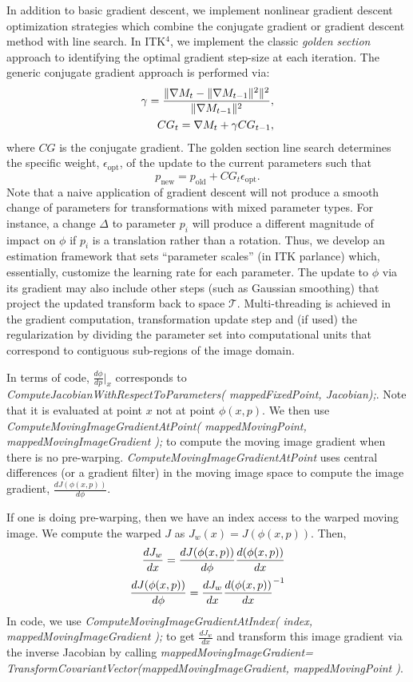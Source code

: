 \documentclass{frontiersSCNS}
\begin{document}
In addition to basic gradient descent, we implement nonlinear gradient
descent optimization strategies which combine the conjugate gradient
or gradient descent method with line search.  In ITK$^4$, we implement the classic \textit{golden section} approach to identifying the optimal gradient
step-size at each iteration.  The generic conjugate gradient approach
is performed via: 
\begin{align}
\gamma=\frac{\|\nabla M_{t}-\|\nabla M_{t-1}\|^2\|^2}{\|\nabla
  M_{t-1}\|^2}, \\ \notag
CG_t = \nabla M_t + \gamma CG_{t-1},
\end{align}
where $CG$ is the conjugate gradient.  The golden section line search
determines the specific weight, $\epsilon_\text{opt}$, of the update to the current parameters
such that 
$$ 
p_{\text{new}}=p_{\text{old}}+CG_t \epsilon_\text{opt}.
$$
Note that a naive application of gradient descent will not produce a smooth
change of parameters for transformations with mixed parameter types.
For instance, a change $\Delta$ to parameter $p_i$ will produce a
different magnitude of impact on $\phi$ if $p_i$ is a translation rather than a
rotation.  Thus, we develop an estimation framework that sets
``parameter scales'' (in ITK parlance) which, essentially, customize
the learning rate for each parameter.  The update to
$\phi$ via its gradient may also include other steps (such as Gaussian
smoothing) that project the updated transform back to space
$\mathcal{T}$.  Multi-threading is achieved in the gradient computation, transformation update
step and (if used) the regularization by dividing the parameter set
into computational units that correspond to contiguous sub-regions of the image domain.

In terms of code, $\frac{d\phi}{dp}|_x$ corresponds to \textit{ComputeJacobianWithRespectToParameters( mappedFixedPoint, Jacobian);}.  Note that it is evaluated at point $x$ not at point $\phi(x,p)$.  We
then use \textit{ComputeMovingImageGradientAtPoint( mappedMovingPoint,
mappedMovingImageGradient );} to compute the moving image gradient
when there is no pre-warping.  \textit{ComputeMovingImageGradientAtPoint} uses central
differences (or a gradient filter) in the moving image space to
compute the image gradient, $\frac{dJ(\phi(x,p))}{d\phi}$.

 If one is doing pre-warping, then we have an index access to the
 warped moving image.  We compute the warped $J$ as
 $J_w(x)=J(\phi(x,p))$.  Then,
\begin{eqnarray}
\frac{dJ_w}{dx}=\frac{dJ(\phi(x,p))}{d\phi}\frac{d(\phi(x,p))}{dx} \\ \notag
\frac{dJ(\phi(x,p))}{d\phi}=\frac{dJ_w}{dx}{\frac{d(\phi(x,p))}{dx}}^{-1} 
\end{eqnarray}
In code, we use \textit{ComputeMovingImageGradientAtIndex( index,
mappedMovingImageGradient );} to get $\frac{dJ_w}{dx}$ and transform
this image gradient via the inverse Jacobian by calling 
\textit{mappedMovingImageGradient=
TransformCovariantVector(mappedMovingImageGradient, mappedMovingPoint )}.
\end{document}
